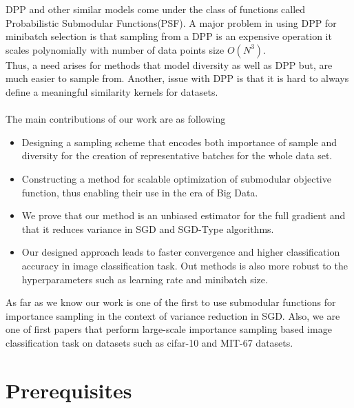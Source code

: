 \documentclass[a4paper,twoside]{iiththesis}
\theoremstyle{definition}
\theoremstyle{definition}
\theoremstyle{remark}
\begin{document}
DPP and other similar models come under the class of functions called Probabilistic Submodular Functions(PSF). A major problem in using DPP for minibatch selection is that sampling from a DPP is an expensive operation it scales polynomially with number of data points size $O(N^3)$. \\
Thus, a need arises for methods that model diversity as well as DPP but, are much easier to sample from.  Another, issue with DPP is that it is hard to always define a meaningful similarity kernels for datasets. 
\\
\\
The main contributions of our work are as following 
\begin{itemize}
    \item Designing a sampling scheme that encodes both importance of sample and diversity for the creation of representative batches for the whole data set.
    \item Constructing a method for scalable optimization of submodular objective function, thus enabling their use in the era of Big Data. 
    \item We prove that our method is an unbiased estimator for the full gradient and that it reduces variance in SGD and SGD-Type algorithms.
    \item Our designed approach leads to faster convergence and higher classification accuracy in image classification task. Out methods is also more robust to the hyperparameters such as learning rate and minibatch size. 
\end{itemize}

As far as we know our work is one of the first to use submodular functions for importance sampling in the context of variance reduction in SGD. Also, we are one of first papers that perform large-scale importance sampling based image classification task on datasets such as cifar-10 and MIT-67 datasets.

\part{Prerequisites }
\end{document}
